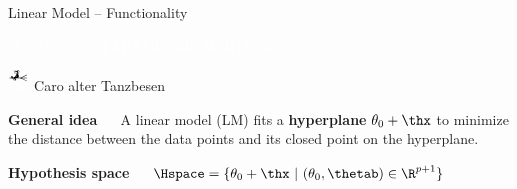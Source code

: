 \documentclass[11pt,compress,t,notes=noshow, xcolor=table]{beamer}
\newcommand{\maketag}[1]{\colorbox{highlightcol}{\textcolor{white}
{\MakeUppercase{#1}}}}
\newcommand{\highlight}[1]{\textcolor{highlightcol}{\textbf{#1}}}
\begin{document}
\begin{frame}{Linear Model -- Functionality}

\footnotesize

\maketag{SUPERVISED}
\maketag{PARAMETRIC}
\maketag{WHITE-BOX}


\medskip

$\overleftwitchonbroom*{\textcolor{white}{abc}}$
Caro alter Tanzbesen

\highlight{General idea} ~~  
A linear model (LM) fits a \textbf{hyperplane} $\theta_0 + \thx$ to minimize the distance between the data points and its closed point on the hyperplane. 

\medskip

\highlight{Hypothesis space} ~~
$\Hspace = \{ \theta_0 + \thx\ |\ (\theta_0, \thetab) \in \R^{p+1} \}$




\end{frame}
\end{document}
